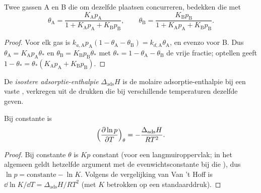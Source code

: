 \begin{proposition}\label{prop:b3:surfaces-catalysis:competitive}
Twee gassen A en B die om dezelfde plaatsen concurreren, bedekken die met
\[
  \theta_{\mathrm A} = \frac{K_{\mathrm A}p_{\mathrm A}}{1 + K_{\mathrm A}p_{\mathrm A} + K_{\mathrm B}p_{\mathrm B}}, \qquad
  \theta_{\mathrm B} = \frac{K_{\mathrm B}p_{\mathrm B}}{1 + K_{\mathrm A}p_{\mathrm A} + K_{\mathrm B}p_{\mathrm B}} .
\]
\end{proposition}

\begin{proof}
Voor elk gas is $k_{a,\mathrm A}p_{\mathrm A}(1 - \theta_{\mathrm A} - \theta_{\mathrm B}) = k_{d,\mathrm A}\theta_{\mathrm A}$, en evenzo voor B. Dus
$\theta_{\mathrm A} = K_{\mathrm A}p_{\mathrm A}\theta_\ast$ en $\theta_{\mathrm B} = K_{\mathrm B}p_{\mathrm B}\theta_\ast$ met $\theta_\ast = 1 - \theta_{\mathrm A} - \theta_{\mathrm B}$ de vrije fractie; optellen
geeft
$1 - \theta_\ast = \theta_\ast(K_{\mathrm A}p_{\mathrm A} + K_{\mathrm B}p_{\mathrm B})$.
\end{proof}

\begin{definition}\label{def:b3:surfaces-catalysis:isosteric}
De \emph{isostere adsorptie-enthalpie}
$\Delta_{\mathrm{ads}}H$ is de molaire adsorptie-enthalpie bij een vaste
, verkregen uit de drukken die bij verschillende
temperaturen dezelfde  geven.
\end{definition}

\begin{proposition}\label{prop:b3:surfaces-catalysis:isosteric}
Bij constante  is
\[
  \Bigl(\frac{\partial\ln p}{\partial T}\Bigr)_\theta = -\frac{\Delta_{\mathrm{ads}}H}{RT^2} .
\]
\end{proposition}

\begin{proof}
Bij constante $\theta$ is $Kp$ constant (voor een langmuiroppervlak; in het
algemeen geldt hetzelfde argument met de evenwichtsconstante bij die
), dus $\ln p =
\text{constante} - \ln K$. Volgens de vergelijking van Van 't Hoff is $\dd\ln K/\dd T = \Delta_{\mathrm{ads}}H/RT^2$ (met $K$
betrokken op een standaarddruk).
\end{proof}

